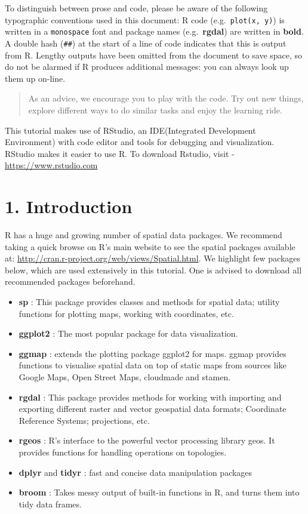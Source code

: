 \documentclass[]{article}
\providecommand{\tightlist}{%
  \setlength{\itemsep}{0pt}\setlength{\parskip}{0pt}}
\begin{document}
To distinguish between prose and code, please be aware of the following
typographic conventions used in this document: R code
(e.g.~\texttt{plot(x,\ y)}) is written in a \texttt{monospace} font and
package names (e.g.~\textbf{rgdal}) are written in \textbf{bold}. A
double hash (\texttt{\#\#}) at the start of a line of code indicates
that this is output from R. Lengthy outputs have been omitted from the
document to save space, so do not be alarmed if R produces additional
messages: you can always look up them up on-line.

\begin{quote}
As an advice, we encourage you to play with the code. Try out new
things, explore different ways to do similar tasks and enjoy the
learning ride.
\end{quote}

This tutorial makes use of RStudio, an IDE(Integrated Development
Environment) with code editor and tools for debugging and visualization.
RStudio makes it easier to use R. To download Rstudio, visit -
\url{https://www.rstudio.com}

\clearpage

\hypertarget{introduction}{%
\section{1. Introduction}\label{introduction}}

R has a huge and growing number of spatial data packages. We recommend
taking a quick browse on R's main website to see the spatial packages
available at: \url{http://cran.r-project.org/web/views/Spatial.html}. We
highlight few packages below, which are used extensively in this
tutorial. One is advised to download all recommended packages
beforehand.

\begin{itemize}
\tightlist
\item
  \textbf{sp} : This package provides classes and methods for spatial
  data; utility functions for plotting maps, working with coordinates,
  etc.
\item
  \textbf{ggplot2} : The most popular package for data visualization.
\item
  \textbf{ggmap} : extends the plotting package ggplot2 for maps. ggmap
  provides functions to visualise spatial data on top of static maps
  from sources like Google Maps, Open Street Maps, cloudmade and stamen.
\item
  \textbf{rgdal} : This package provides methods for working with
  importing and exporting different raster and vector geospatial data
  formats; Coordinate Reference Systems; projections, etc.
\item
  \textbf{rgeos} : R's interface to the powerful vector processing
  library geos. It provides functions for handling operations on
  topologies.
\item
  \textbf{dplyr} and \textbf{tidyr} : fast and concise data manipulation
  packages
\item
  \textbf{broom} : Takes messy output of built-in functions in R, and
  turns them into tidy data frames.
\end{itemize}
\end{document}
